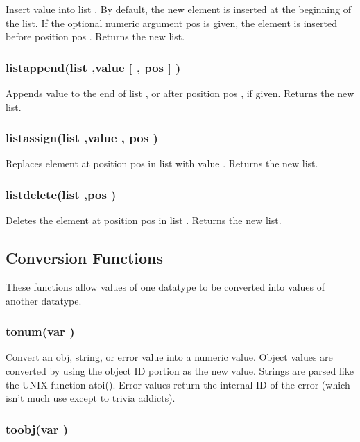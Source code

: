 Insert {\funcarg value } into {\funcarg list }.  By default, the new
element is inserted at the beginning of the list.  If the optional
numeric argument {\funcarg pos } is given, the element is inserted
before position {\funcarg pos }.  Returns the new list.

\subsubsection{\func listappend({\funcarg list },{\funcarg value $[$ }, {\funcarg pos $]$ })}

Appends {\funcarg value } to the end of {\funcarg list }, or after position
{\funcarg pos }, if given.  Returns the new list.

\subsubsection{\func listassign({\funcarg list },{\funcarg value }, {\funcarg pos })}

Replaces element at position {\funcarg pos } in {\funcarg list } with
{\funcarg value }.  Returns the new list.

\subsubsection{\func listdelete({\funcarg list },{\funcarg pos })}

Deletes the element at position {\funcarg pos } in {\funcarg list }.
Returns the new list.

\subsection{Conversion Functions}

These functions allow values of one datatype to be converted into
values of another datatype.

\subsubsection{\func tonum({\funcarg var })}

Convert an obj, string, or error value into a numeric value.  Object
values are converted by using the object ID portion as the new
value.  Strings are parsed like the UNIX function atoi().  Error
values return the internal ID of the error (which isn't much use
except to trivia addicts).

\subsubsection{\func toobj({\funcarg var })}

